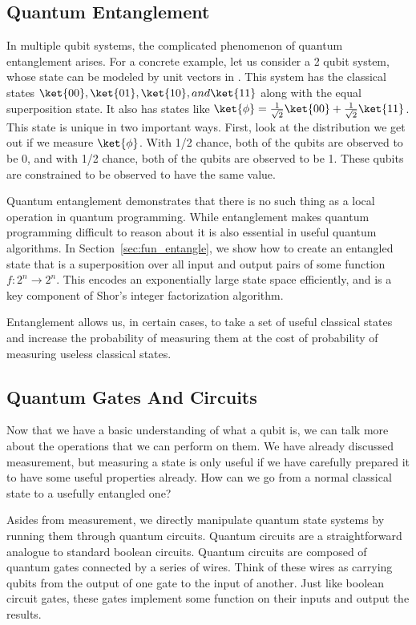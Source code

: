 \subsection{Quantum Entanglement}
\label{sec:entangle}
In multiple qubit systems, the complicated phenomenon of quantum entanglement arises.
For a concrete example, let us consider a 2 qubit system, whose state can be modeled by unit vectors in .
This system has the classical states $\ket{00}, \ket{01}, \ket{10}, and \ket{11}$ along with the equal superposition state.
It also has states like $\ket{\phi} = \frac{1}{\sqrt{2}}\ket{00} + \frac{1}{\sqrt{2}}\ket{11}$.
This state is unique in two important ways.
First, look at the distribution we get out if we measure $\ket{\phi}$.
With 1/2 chance, both of the qubits are observed to be 0, and with 1/2 chance, both of the qubits are observed to be 1.
These qubits are constrained to be observed to have the same value. 

Quantum entanglement demonstrates that there is no such thing as a local operation in quantum programming.
While entanglement makes quantum programming difficult to reason about it is also essential in useful quantum algorithms.
In Section~\ref{sec:fun_entangle}, we show how to create an entangled state that is a superposition over all input and output pairs of some function $f : 2^n\rightarrow 2^n$.
This encodes an exponentially large state space efficiently, and is a key component of Shor's integer factorization algorithm.

Entanglement allows us, in certain cases, to take a set of useful classical states and increase the probability of measuring them at the cost of probability of measuring useless classical states.
\subsection{Quantum Gates And Circuits}
\label{sec:gates_circs}
Now that we have a basic understanding of what a qubit is, we can talk more about the operations that we can perform on them.
We have already discussed measurement, but measuring a state is only useful if we have carefully prepared it to have some useful properties already.
How can we go from a normal classical state to a usefully entangled one?

Asides from measurement, we directly manipulate quantum state systems by running them through quantum circuits.
Quantum circuits are a straightforward analogue to standard boolean circuits.
Quantum circuits are composed of quantum gates connected by a series of wires.
Think of these wires as carrying qubits from the output of one gate to the input of another.
Just like boolean circuit gates, these gates implement some function on their inputs and output the results. 

